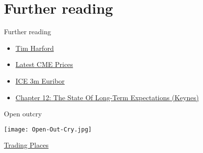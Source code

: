 \documentclass[14pt,xcolor=pdftex,dvipsnames,table]{beamer}\usepackage[]{graphicx}\usepackage[]{color}
\begin{document}
\section{Further reading}
\begin{frame}{Further reading}
\begin{itemize}[<+-| alert@+>]
\pause
\item \href{http://timharford.com/2016/03/how-to-make-good-guesses/}{Tim Harford}
\item \href{www.cmegroup.com/trading/interest-rates/eurodollar.html}{Latest CME Prices}
\item \href{https://www.theice.com/products/38527986/Three-Month-Euribor-Futures}{ICE 3m Euribor}
\item \href{https://www.marxists.org/reference/subject/economics/keynes/general-theory/ch12.htm}{Chapter 12: The State Of Long-Term Expectations (Keynes)} 
\end{itemize}
\end{frame}

\begin{frame}{Open outcry}
\begin{center}
\texttt{[image: Open-Out-Cry.jpg]}
\end{center}
\href{https://www.youtube.com/watch?v=RLySXTIBS3c}{Trading Places}
\end{frame}
\end{document}
